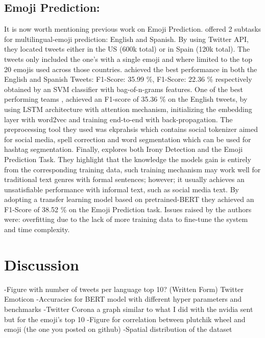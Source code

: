 \documentclass[11pt]{article}
\begin{document}
\subsection{Emoji Prediction:}
It is now worth mentioning previous work on Emoji Prediction. \cite{SemEval2018Task2} offered 2 subtasks for multilingual-emoji prediction: English and Spanish. By using Twitter API,
they located tweets either in the US (600k total) or in Spain (120k total). The tweets only included the one's with a single emoji and where limited to the top 20 emojis used across those countries. \cite{Tubingen Olso} achieved 
the best performance in both the English and Spanish Tweets: F1-Score: 35.99 \%, F1-Score: 22.36 \% respectively obtained by an SVM classifier with bag-of-n-grams features. One of the best performing teams 
\cite{NTUA-SLP}, achieved an F1-score of 35.36 \% on the English tweets, by using LSTM architecture with attention mechanism, initializing the embedding layer with word2vec and training end-to-end with back-propagation. 
The preprocessing tool they used was ekprahsis \cite{Baziotis} which contains social tokenizer aimed for social media, spell correction and word segmentation which can be used for hashtag segmentation. Finally, \cite{towards understanding creatieve lang}
explores both Irony Detection and the Emoji Prediction Task. They highlight that the knowledge the models gain is entirely from the corresponding training data, such training mechanism may work well for traditional text genres with formal sentences; however; 
it usually achieves an unsatisfiable performance with informal text, such as social media text.  By adopting a transfer learning model based on pretrained-BERT they achieved an F1-Score of 38.52 \% on the Emoji Prediction task. Issues raised by the authors were: overfitting 
due to the lack of more training data to fine-tune the system and time complexity.  
\section{Discussion}
\label{sec:discussion}
-Figure with number of tweets per language top 10? (Written Form) Twitter Emoticon
-Accuracies for BERT model with different hyper parameters and benchmarks 
-Twitter Corona a graph similar to what I did with the nvidia sent but for the emoji's top 10 
-Figure for correlation between plutchik wheel and emoji (the one you posted on github)
-Spatial distribution of the dataset 

%


\end{document}
